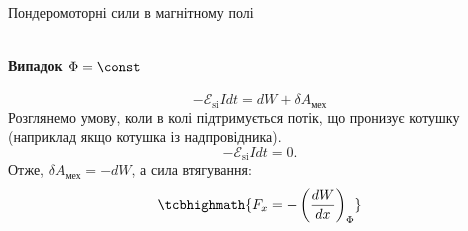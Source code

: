 \documentclass[onlytextwidth]{beamer}
\begin{document}
\begin{frame}{Пондеромоторні сили в магнітному полі}{}
\begin{overprint}
\begin{equation*}
		\end{equation*}
		\framesubtitle<3>{Випадок $\Phi = \const$}
		\begin{equation*}
			-\mathcal{E}_\text{si} I dt = dW + \delta A_\text{мех}
		\end{equation*}
		Розглянемо умову, коли в колі підтримується потік, що пронизує котушку (наприклад якщо котушка із надпровідника).
		\begin{equation*}
			- \mathcal{E}_\text{si} I dt = 0.
		\end{equation*}
		Отже, $\delta A_\text{мех} = - dW$, а сила втягування:
		\begin{equation*}
			\tcbhighmath{F_x = - \left( \frac{dW}{dx} \right)_{\Phi}}
		\end{equation*}
	\end{overprint}
\end{frame}
\end{document}
